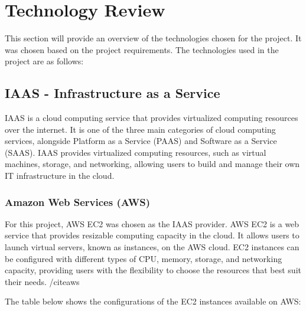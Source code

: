 \setlength{\headheight}{15pt}
\addtolength{\topmargin}{-2.5pt}

\chapter{Technology Review}
This section will provide an overview of the technologies chosen for the project. It was chosen based on the project requirements. 
The technologies used in the project are as follows:


\section{IAAS - Infrastructure as a Service}
IAAS is a cloud computing service that provides virtualized computing resources over the internet. It is one of the three main categories of cloud computing 
services, alongside Platform as a Service (PAAS) and Software as a Service (SAAS). IAAS provides virtualized computing resources, such as virtual machines, 
storage, and networking, allowing users to build and manage their own IT infrastructure in the cloud.

\subsection{Amazon Web Services (AWS)}
For this project, AWS EC2 was chosen as the IAAS provider. AWS EC2 is a web service that provides resizable computing capacity in the cloud. It allows users to
launch virtual servers, known as instances, on the AWS cloud. EC2 instances can be configured with different types of CPU, memory, storage, and networking capacity,
providing users with the flexibility to choose the resources that best suit their needs. /cite{aws} 

The table below shows the configurations of the EC2 instances available on AWS\cite{aws}:

